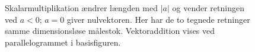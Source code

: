 \begin{figure}[htbp]
\centering
{}
\caption{Skalarmultiplikation ændrer længden med $|a|$ og vender retningen ved $a<0$; $a=0$ giver nulvektoren. Her har de to tegnede retninger samme dimensionsløse målestok. Vektoraddition vises ved parallelogrammet i basisfiguren.}
\label{fig:b1-vektorskalering}
\end{figure}
